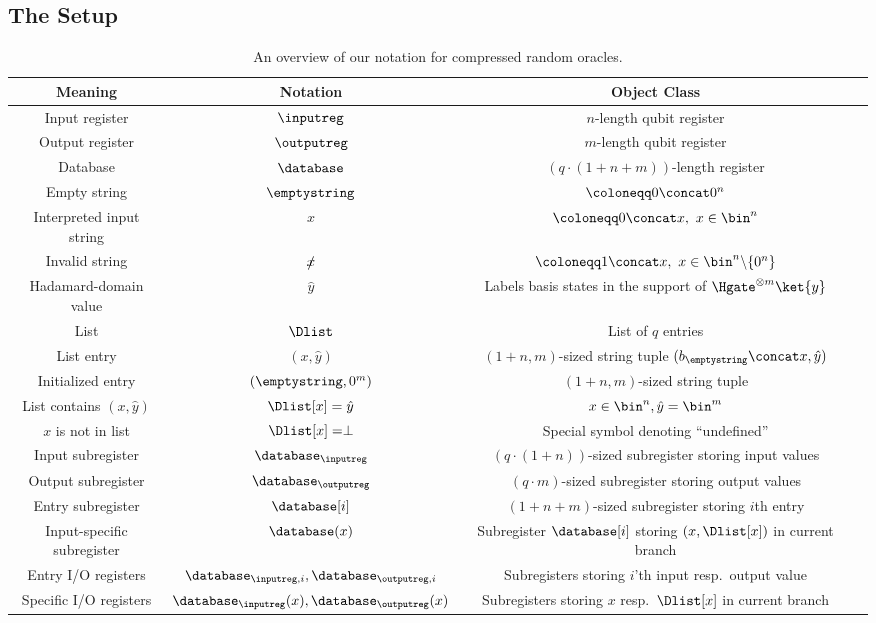   \subsection{The Setup}
    \begin{table}[t]
      \centering
      \caption{
        \label{tab:cro-notation}
        An overview of our notation for compressed random oracles.
      }
      \begin{tabular}{cccc}
        \toprule
        Meaning & Notation & Object Class \\
        \midrule
        Input register & $\inputreg$ & $n$-length qubit register \\
        Output register & $\outputreg$ & $m$-length qubit register \\
        Database & $\database$ & $(q \cdot (1 + n + m))$-length register \\
        \midrule
        Empty string & $\emptystring$ & $\coloneqq 0 \concat 0^n$ \\
        Interpreted input string & $x$ & $\coloneqq 0 \concat x,\ x \in \bin^n$ \\
        Invalid string & $\slashed{x}$ & $\coloneqq 1 \concat x,\ x \in \bin^n \backslash \{0^n\}$ \\
        Hadamard-domain value & $\hat{y}$ & Labels basis states in the support of $\Hgate^{\otimes m} \ket{y}$ \\
        \midrule
        List & $\Dlist$ & List of $q$ entries \\
        List entry & $(x, \hat y)$ & $(1 + n, m)$-sized string tuple $(b_\emptystring \concat x, \hat y)$ \\
        Initialized entry & $(\emptystring,0^m)$ & $(1 + n, m)$-sized string tuple \\
        List contains $(x,\hat y)$ & $\Dlist[x] = \hat{y}$ & $x \in \bin^n, \hat{y} = \bin^m$ \\
        $x$ is not in list & $\Dlist[x] = \perp$ & Special symbol denoting ``undefined'' \\
        \midrule
        Input subregister & $\database_\inputreg$ & $(q \cdot (1 + n))$-sized subregister storing input values \\
        Output subregister & $\database_\outputreg$ & $(q \cdot m)$-sized subregister storing output values \\
        Entry subregister & $\database[i]$ & $(1+n+m)$-sized subregister storing $i$th entry \\
        Input-specific subregister & $\database(x)$ & Subregister
        $\database[i]$ storing $(x, \Dlist[x])$ in current branch \\
        Entry I/O registers & $\database_{\inputreg, i}, \database_{\outputreg, i}$ & Subregisters storing $i$'th input resp.\ output value \\
        Specific I/O registers & $\database_\inputreg(x),
        \database_\outputreg(x)$ & Subregisters storing $x$ resp.\ $\Dlist[x]$ in current branch \\
        \bottomrule
      \end{tabular}
    \end{table}

